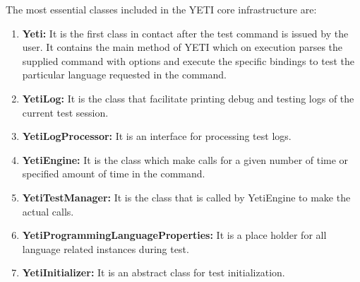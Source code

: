 The most essential classes included in the YETI core infrastructure are:
\begin{enumerate}
\item {\textbf{Yeti:}} It is the first class in contact after the test command is issued by the user. It contains the main method of YETI which on execution parses the supplied command with options and execute the specific bindings to test the particular language requested in the command.
\item {\textbf{YetiLog:}} It is the class that facilitate printing debug and testing logs of the current test session. 
\item {\textbf{YetiLogProcessor:}} It is an interface for processing test logs.
\item {\textbf{YetiEngine:}} It is the class which make calls for a given number of time or specified amount of time in the command.
\item {\textbf{YetiTestManager:}} It is the class that is called by YetiEngine to make the actual calls.
\item {\textbf{YetiProgrammingLanguageProperties:}} It is a place holder for all language related instances during test.
\item {\textbf{YetiInitializer:}} It is an abstract class for test initialization.
\end{enumerate}

